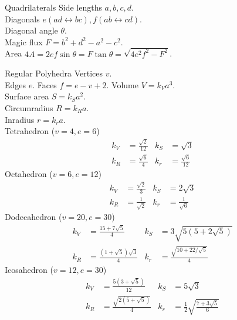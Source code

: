 \begin{algorithm}{Quadrilaterals}
\desc
Side lengths $a, b, c, d$.\\
Diagonals $e (ad \leftrightarrow bc), f (ab \leftrightarrow cd)$.\\
Diagonal angle $\theta$.\\
Magic flux $F = b^2+d^2-a^2-c^2$.\\
Area $4A = 2ef\sin \theta = F\tan \theta = \sqrt{4e^2f^2 - F^2}$.\\

\end{algorithm}

\begin{algorithm}{Regular Polyhedra}
\desc
Vertices $v$.\\
Edges $e$.
Faces $f = e-v+2$.
Volume $V = k_V a^3$.\\
Surface area $S = k_S a^2$.\\
Circumradius $R = k_R a$.\\
Inradius $r = k_r a$.\\

Tetrahedron ($v = 4, e = 6$)
\begin{align*} 
  k_V &= \frac{\sqrt{2}}{12} & k_S &= \sqrt{3}\\
  k_R &= \frac{\sqrt{6}}{4}    & k_r &= \frac{\sqrt{6}}{12}
\end{align*}
Octahedron ($v = 6, e = 12$)
\begin{align*} 
  k_V &= \frac{\sqrt{2}}{3} & k_S &= 2\sqrt{3}\\
  k_R &= \frac{1}{\sqrt{2}}    & k_r &= \frac{1}{\sqrt{6}}
\end{align*}
Dodecahedron ($v = 20, e = 30$)
\begin{align*} 
  k_V &= \frac{15 + 7\sqrt{5}}{4} & k_S &= 3\sqrt{5(5+2\sqrt{5})}\\
  k_R &= \frac{(1+\sqrt{5})\sqrt{3}}{4} & k_r &= \frac{\sqrt{10 + 22/\sqrt{5}}}{4}
\end{align*}
Icosahedron ($v = 12, e = 30$)
\begin{align*}
  k_V &= \frac{5(3 + \sqrt{5})}{12} & k_S &= 5\sqrt{3}\\
  k_R &= \frac{\sqrt{2(5+\sqrt{5})}}{4} & k_r &= \frac{1}{2}\sqrt{\frac{7+3\sqrt{5}}{6}}
\end{align*}
  
\end{algorithm}